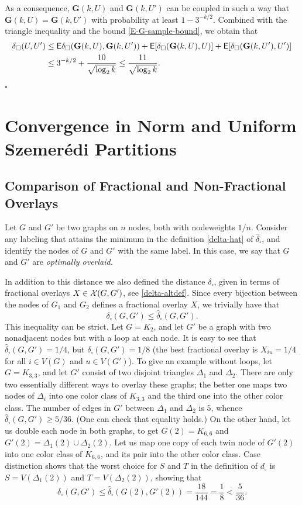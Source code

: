 \documentclass[12pt]{article}
\numberwithin{equation}{section}
\def\iv{\widehat}
\def\E{{\sf E}}
\def\bG{{\mathbf G}}
\begin{document}
As a consequence, $\bG(k,U)$ and $\bG(k,U')$ can be coupled in such a
way that $\bG(k,U)=\bG(k,U')$ with probability at least $1-3^{-k/2}$.
Combined with the triangle inequality and
the bound \eqref{E-G-sample-bound}, we obtain
that
\[
\begin{aligned}
\delta_\square(U,U') &\leq
\E{\delta_\square(\bG(k,U),\bG(k,U'))}
+\E[\delta_\square(\bG(k,U),U)]+
\E[\delta_\square(\bG(k,U'),U')]
\\
&\leq 3^{-k/2}+{\frac{10}{\sqrt{\log_2 k}}}
\leq
{\frac{11}{\sqrt{\log_2 k}}.}
\end{aligned}
\]
\hfill$\square$


\section{Convergence in Norm and Uniform Szemer\'edi Partitions}
\label{sec:norm+szem}

\subsection{Comparison of Fractional and Non-Fractional Overlays}
\label{sec:compdist}

Let $G$ and $G'$ be two graphs on $n$ nodes, both with nodeweights
$1/n$.   Consider any labeling that attains the minimum in the
definition \eqref{delta-hat} of $\iv\delta_\square$, and identify
the nodes of $G$ and $G'$ with the same label. In this case, we say
that $G$ and $G'$ are {\it optimally overlaid.}

In addition to this distance we also defined the distance
$\delta_\square$, given in terms of fractional overlays $X\in
{\cal X}(G,G')$, see \eqref{delta-altdef}. Since every bijection between
the nodes of $G_1$ and $G_2$ defines a fractional overlay $X$, we
trivially have that
\[
\delta_\square(G,G')\le \iv\delta_\square(G,G').
\]
This inequality can be strict. Let $G=K_2$, and let $G'$ be a graph
with two nonadjacent nodes but with a loop at each node. It is easy
to see that $\iv\delta_\square(G,G')=1/4$, but
$\delta_\square(G,G')=1/8$ (the best fractional overlay is
$X_{iu}=1/4$ for all $i\in V(G)$ and $u\in V(G')$). To give an
example without loops, let $G=K_{3,3}$, and let $G'$ consist of two
disjoint triangles $\Delta_1$ and $\Delta_2$. There are only two
essentially different ways to overlay these graphs; the better one
maps two nodes of $\Delta_i$ into one color class of $K_{3,3}$ and
the third one into the other color class. The number of edges in
$G'$ between $\Delta_1$ and $\Delta_2$ is $5$, whence
$\iv\delta_\square(G,G')\ge 5/36$. (One can check that equality
holds.) On the other hand, let us double each node in both graphs,
to get $G(2)=K_{6,6}$ and $G'(2)=\Delta_1(2)\cup \Delta_2(2)$. Let
us map one copy of each twin node of $G'(2)$ into one color class of
$K_{6,6}$, and its pair into the other color class. Case distinction
shows that the worst choice for $S$ and $T$ in the definition of
$d_\square$ is $S=V(\Delta_1(2))$ and $T=V(\Delta_2(2))$, showing
that
\[
\delta_\square(G,G')\le \iv\delta_\square(G(2),G'(2))=\frac{18}{144}
= \frac{1}{8}<\frac{5}{36}.
\]
\end{document}

